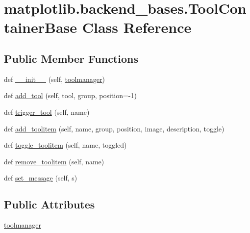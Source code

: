 \hypertarget{classmatplotlib_1_1backend__bases_1_1ToolContainerBase}{}\section{matplotlib.\+backend\+\_\+bases.\+Tool\+Container\+Base Class Reference}
\label{classmatplotlib_1_1backend__bases_1_1ToolContainerBase}
\subsection*{Public Member Functions}
\begin{DoxyCompactItemize}
\item 
def \hyperlink{classmatplotlib_1_1backend__bases_1_1ToolContainerBase_a0ad1737564133249dfe5a394439a9e77}{\+\_\+\+\_\+init\+\_\+\+\_\+} (self, \hyperlink{classmatplotlib_1_1backend__bases_1_1ToolContainerBase_a0fe5a57383e07efb58bfe6820dd8b67b}{toolmanager})
\item 
def \hyperlink{classmatplotlib_1_1backend__bases_1_1ToolContainerBase_a9c026e3d477c16cf75b655f860bbc4f8}{add\+\_\+tool} (self, tool, group, position=-\/1)
\item 
def \hyperlink{classmatplotlib_1_1backend__bases_1_1ToolContainerBase_ab4fc6d3d15370c43d87345e7a19d2f89}{trigger\+\_\+tool} (self, name)
\item 
def \hyperlink{classmatplotlib_1_1backend__bases_1_1ToolContainerBase_abde6fc57ff2c485c2271ffda7524350a}{add\+\_\+toolitem} (self, name, group, position, image, description, toggle)
\item 
def \hyperlink{classmatplotlib_1_1backend__bases_1_1ToolContainerBase_a15f109cb07c4bc97ee3674243b7bc113}{toggle\+\_\+toolitem} (self, name, toggled)
\item 
def \hyperlink{classmatplotlib_1_1backend__bases_1_1ToolContainerBase_a0cb9190bb61f0d767a38a29d93598b8f}{remove\+\_\+toolitem} (self, name)
\item 
def \hyperlink{classmatplotlib_1_1backend__bases_1_1ToolContainerBase_aac3656e54a106ba6583f11fbaf1d2250}{set\+\_\+message} (self, s)
\end{DoxyCompactItemize}
\subsection*{Public Attributes}
\begin{DoxyCompactItemize}
\item 
\hyperlink{classmatplotlib_1_1backend__bases_1_1ToolContainerBase_a0fe5a57383e07efb58bfe6820dd8b67b}{toolmanager}
\end{DoxyCompactItemize}


